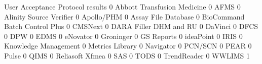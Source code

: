 \documentclass{article}
\begin{document}
\begin{Schunk}
\begin{Soutput}
                                User Acceptance Protocol results
                                                               0
  Abbott Transfusion Medicine                                  0
  AFMS                                                         0
  Alinity Source Verifier                                      0
  Apollo/PHM                                                   0
  Assay File Database                                          0
  BioCommand Batch Control Plus                                0
  CMSNext                                                      0
  DARA Filler DHM and RU                                       0
  DaVinci                                                      0
  DFCS                                                         0
  DPW                                                          0
  EDMS                                                         0
  eNovator                                                     0
  Groninger                                                    0
  GS Reports                                                   0
  ideaPoint                                                    0
  IRIS                                                         0
  Knowledge Management                                         0
  Metrics Library                                              0
  Navigator                                                    0
  PCN/SCN                                                      0
  PEAR                                                         0
  Pulse                                                        0
  QIMS                                                         0
  Reliasoft Xfmea                                              0
  SAS                                                          0
  TODS                                                         0
  TrendReader                                                  0
  WWLIMS                                                       1
                               

\end{Soutput}
\end{Schunk}
\end{document}
